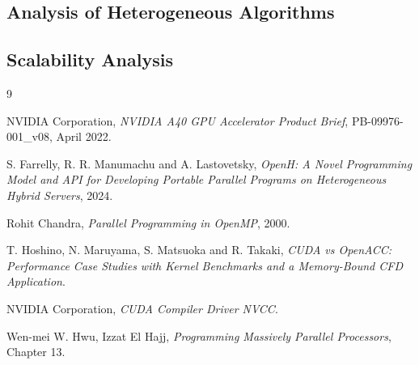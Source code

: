 \documentclass[12pt,a4paper]{article}
\begin{document}
\subsection{Analysis of Heterogeneous Algorithms}

\subsection{Scalability Analysis}


\begin{thebibliography}{9}

NVIDIA Corporation,
\textit{NVIDIA A40 GPU Accelerator Product Brief},
PB-09976-001\_v08, April 2022.

S. Farrelly, R. R. Manumachu and A. Lastovetsky,
\textit{OpenH: A Novel Programming Model and API for Developing Portable Parallel Programs
on Heterogeneous Hybrid Servers}, 2024.

Rohit Chandra,
\textit{Parallel Programming in OpenMP}, 2000.

T. Hoshino, N. Maruyama, S. Matsuoka and R. Takaki,
\textit{CUDA vs OpenACC: Performance Case Studies with Kernel Benchmarks and a
Memory-Bound CFD Application}.

NVIDIA Corporation,
\textit{CUDA Compiler Driver NVCC}.

Wen-mei W. Hwu, Izzat El Hajj,
\textit{Programming Massively Parallel Processors}, Chapter 13.

\end{thebibliography}
\end{document}
